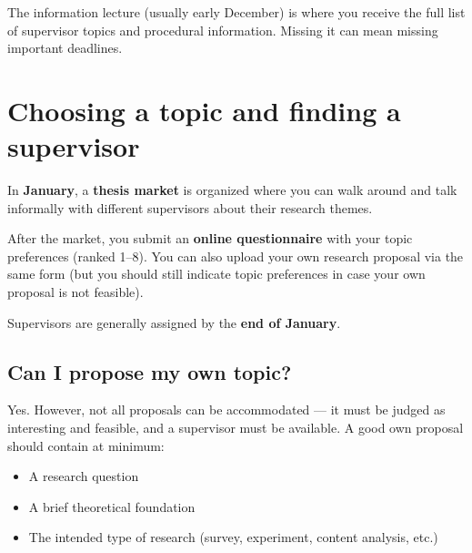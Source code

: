 \documentclass[
  11pt,
  a4paper,
]{scrbook}
\providecommand{\tightlist}{%
  \setlength{\itemsep}{0pt}\setlength{\parskip}{0pt}}\usepackage{longtable,booktabs,array}
\begin{document}
\begin{tcolorbox}[enhanced jigsaw, bottomrule=.15mm, opacityback=0, toprule=.15mm, colframe=quarto-callout-important-color-frame, left=2mm, rightrule=.15mm, title=\textcolor{quarto-callout-important-color}{\faExclamation}\hspace{0.5em}{Don't miss the information lecture}, colbacktitle=quarto-callout-important-color!10!white, bottomtitle=1mm, colback=white, breakable, toptitle=1mm, titlerule=0mm, leftrule=.75mm, arc=.35mm, opacitybacktitle=0.6, coltitle=black]

The information lecture (usually early December) is where you receive
the full list of supervisor topics and procedural information. Missing
it can mean missing important deadlines.

\end{tcolorbox}

\section{Choosing a topic and finding a
supervisor}\label{choosing-a-topic-and-finding-a-supervisor}

In \textbf{January}, a \textbf{thesis market} is organized where you can
walk around and talk informally with different supervisors about their
research themes.

After the market, you submit an \textbf{online questionnaire} with your
topic preferences (ranked 1--8). You can also upload your own research
proposal via the same form (but you should still indicate topic
preferences in case your own proposal is not feasible).

Supervisors are generally assigned by the \textbf{end of January}.

\subsection{Can I propose my own
topic?}\label{can-i-propose-my-own-topic}

Yes. However, not all proposals can be accommodated --- it must be
judged as interesting and feasible, and a supervisor must be available.
A good own proposal should contain at minimum:

\begin{itemize}
\tightlist
\item
  A research question
\item
  A brief theoretical foundation
\item
  The intended type of research (survey, experiment, content analysis,
  etc.)
\end{itemize}
\end{document}
